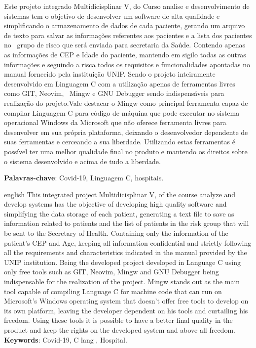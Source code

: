 \documentclass[
	12pt,				%
	oneside,			%
	a4paper,			%
  section=TITLE,
	brazil,				%
	]{abntex2}
\begin{document}
\begin{resumo}

Este projeto integrado Multidicisplinar V, do Curso analise e desenvolvimento
de sistemas tem o objetivo de desenvolver um software de alta qualidade e
simplificando o armazenamento de dados de cada paciente, gerando um arquivo de
texto para salvar as informações referentes aos pacientes e a lista dos
pacientes no  grupo de risco que será enviada para secretaria da Saúde.
Contendo apenas as informações de CEP e Idade do paciente, mantendo em sigilo
todas as outras informações e seguindo a risca todos os requisitos e
funcionalidades apontadas no manual fornecido pela instituição UNIP.  Sendo o
projeto inteiramente desenvolvido em Linguagem C com a utilização apenas de
ferramentas livres como GIT, Neovim,  Mingw e GNU Debugger sendo indispensáveis
para realização do projeto.Vale destacar o Mingw como principal ferramenta
capaz de compilar Linguagem C para código de máquina que pode executar no
sistema operacional Windows da Microsoft que não oferece ferramenta livres para
desenvolver em sua própria plataforma, deixando o desenvolvedor dependente de
suas ferramentas e cerceando a sua liberdade.  Utilizando estas ferramentas é
possível ter uma melhor qualidade final no produto e mantendo os direitos sobre
o sistema desenvolvido e acima de tudo a liberdade.

 \textbf{Palavras-chave}: Covid-19, Linguagem C, hospitais.
\end{resumo}


\begin{resumo}[Abstract]
 \begin{otherlanguage*}{english}
This integrated project Multidicisplinar V, of the course analyze and develop
systems has the objective of developing high quality software and simplifying
the data storage of each patient, generating a text file to save as information
related to patients and the list of patients in the risk group that will be
sent to the Secretary of Health. Containing only the information of the
patient's CEP and Age, keeping all information confidential and strictly
following all the requirements and characteristics indicated in the manual
provided by the UNIP institution. Being the developed project developed in
Language C using only free tools such as GIT, Neovim, Mingw and GNU Debugger
being indispensable for the realization of the project. Mingw stands out as the
main tool capable of compiling Language C for machine code that can run on
Microsoft's Windows operating system that doesn't offer free tools to develop
on its own platform, leaving the developer dependent on his tools and
curtailing his freedom. Using these tools it is possible to have a better final
quality in the product and keep the rights on the developed system and above
all freedom.
   \vspace{\onelineskip}
   \noindent
   \textbf{Keywords}: Covid-19, C lang , Hospital.
 \end{otherlanguage*}
\end{resumo}
\end{document}
